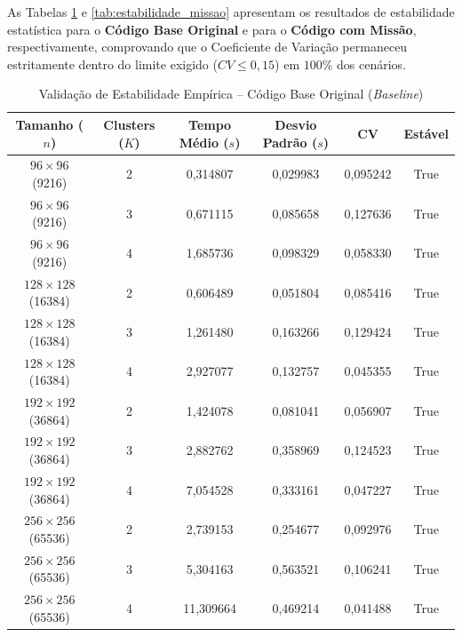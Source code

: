 \documentclass[11pt,a4paper]{article}
\begin{document}
As Tabelas \ref{tab:estabilidade_base} e \ref{tab:estabilidade_missao} apresentam os resultados de estabilidade estatística para o \textbf{Código Base Original} e para o \textbf{Código com Missão}, respectivamente, comprovando que o Coeficiente de Variação permaneceu estritamente dentro do limite exigido ($CV \le 0,15$) em $100\%$ dos cenários.

\begin{table}[H]
\centering
\caption{Validação de Estabilidade Empírica -- Código Base Original (\textit{Baseline})}
\label{tab:estabilidade_base}
\small
\setlength{\tabcolsep}{6pt}
\begin{tabular}{@{}cccccc@{}}
\toprule
\textbf{Tamanho ($n$)} & \textbf{Clusters ($K$)} & \textbf{Tempo Médio ($s$)} & \textbf{Desvio Padrão ($s$)} & \textbf{CV} & \textbf{Estável} \\ \midrule
$96 \times 96$ (9216)    & 2 & 0,314807  & 0,029983 & 0,095242 & True \\
$96 \times 96$ (9216)    & 3 & 0,671115  & 0,085658 & 0,127636 & True \\
$96 \times 96$ (9216)    & 4 & 1,685736  & 0,098329 & 0,058330 & True \\
$128 \times 128$ (16384) & 2 & 0,606489  & 0,051804 & 0,085416 & True \\
$128 \times 128$ (16384) & 3 & 1,261480  & 0,163266 & 0,129424 & True \\
$128 \times 128$ (16384) & 4 & 2,927077  & 0,132757 & 0,045355 & True \\
$192 \times 192$ (36864) & 2 & 1,424078  & 0,081041 & 0,056907 & True \\
$192 \times 192$ (36864) & 3 & 2,882762  & 0,358969 & 0,124523 & True \\
$192 \times 192$ (36864) & 4 & 7,054528  & 0,333161 & 0,047227 & True \\
$256 \times 256$ (65536) & 2 & 2,739153  & 0,254677 & 0,092976 & True \\
$256 \times 256$ (65536) & 3 & 5,304163  & 0,563521 & 0,106241 & True \\
$256 \times 256$ (65536) & 4 & 11,309664 & 0,469214 & 0,041488 & True \\ \bottomrule
\end{tabular}
\end{table}
\end{document}
